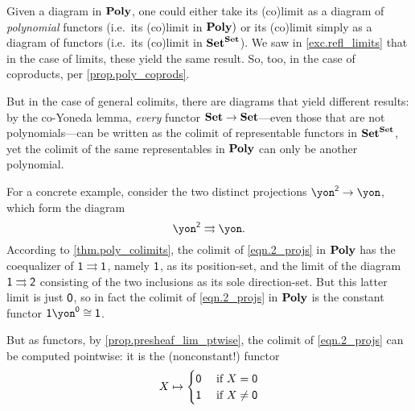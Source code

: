 \documentclass[Book-Poly]{subfiles}
\begin{document}
\begin{example}
Given a diagram in $\mathbf{Poly}$, one could either take its (co)limit as a diagram of \emph{polynomial} functors (i.e.\ its (co)limit in $\mathbf{Poly})$ or its (co)limit simply as a diagram of functors (i.e.\ its (co)limit in $\mathbf{Set}^{\mathbf{Set}}$).
We saw in \cref{exc.refl_limits} that in the case of limits, these yield the same result.
So, too, in the case of coproducts, per \cref{prop.poly_coprods}.

But in the case of general colimits, there are diagrams that yield different results: by the co-Yoneda lemma, \emph{every} functor $\mathbf{Set} \to \mathbf{Set}$---even those that are not polynomials---can be written as the colimit of representable functors in $\mathbf{Set}^{\mathbf{Set}}$, yet the colimit of the same representables in $\mathbf{Poly}$ can only be another polynomial.

For a concrete example, consider the two distinct projections $\yon^\2\to\yon$, which form the diagram
\begin{equation} \label{eqn.2_projs}
    \yon^\2\tto\yon.
\end{equation}
According to \cref{thm.poly_colimits}, the colimit of \eqref{eqn.2_projs} in $\mathbf{Poly}$ has the coequalizer of $\textsf{1} \rightrightarrows \textsf{1}$, namely $\textsf{1}$, as its position-set, and the limit of the diagram $\textsf{1} \rightrightarrows \textsf{2}$ consisting of the two inclusions as its sole direction-set.
But this latter limit is just $\textsf{0}$, so in fact the colimit of \eqref{eqn.2_projs} in $\mathbf{Poly}$ is the constant functor $\1\yon^\0\iso\1$.

But as functors, by \cref{prop.presheaf_lim_ptwise}, the colimit of \eqref{eqn.2_projs} can be computed pointwise: it is the (nonconstant!) functor
\[
  X\mapsto
  \begin{cases}
  	\textsf{0}&\textnormal{ if }X=\textsf{0}\\
  	\textsf{1}&\textnormal{ if }X\neq\textsf{0}
  \end{cases}
\]
\end{example}
\end{document}
